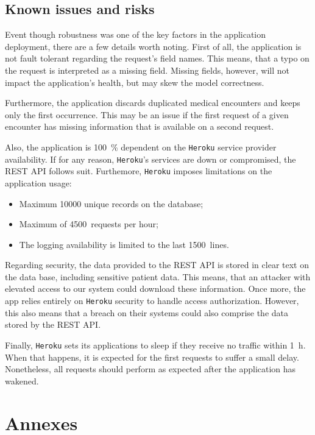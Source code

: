 \documentclass[a4paper,11pt]{article}
\begin{document}
\subsection{Known issues and risks}

Event though robustness was one of the key factors in the application deployment, there are a few details worth noting. First of all, the application is not fault tolerant regarding the request's field names. This means, that a typo on the request is interpreted as a missing field. Missing fields, however, will not impact the application's health, but may skew the model correctness.

Furthermore, the application discards duplicated medical encounters and keeps only the first occurrence. This may be an issue if the first request of a given encounter has missing information that is available on a second request.

Also, the application is \SI{100}{\percent} dependent on the \texttt{Heroku} service provider availability. If for any reason, \texttt{Heroku}'s services are down or compromised, the REST API follows suit. Furthemore, \texttt{Heroku} imposes limitations on the application usage:

\begin{itemize}
    \item Maximum \SI{10000}{} unique records on the database;
    \item Maximum of \SI{4500}{requests}  per hour;
    \item The logging availability is limited to the last \SI{1500}{lines}.
\end{itemize}

Regarding security, the data provided to the REST API is stored in clear text on the data base, including sensitive patient data. This means, that an attacker with elevated access to our system could download these information.
Once more, the app relies entirely on \texttt{Heroku} security to handle access authorization. However, this also means that a breach on their systems could also comprise the data stored by the REST API.

Finally, \texttt{Heroku} sets its applications to sleep if they receive no traffic within \SI{1}{\hour}. When that happens, it is expected for the first requests to suffer a small delay. Nonetheless, all requests should perform as expected after the application has wakened.


\newpage
\section{Annexes}
\end{document}
